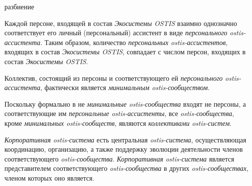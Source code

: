 \begin{SCn}
\begin{scnrelfromset}{разбиение}
\end{scnrelfromset}
\end{SCn}

Каждой персоне, входящей в состав \textit{Экосистемы OSTIS} взаимно однозначно соответствует его личный (персональный) ассистент в виде \textit{персонального ostis-ассистента}.
Таким образом, количество \textit{персональных ostis-ассистентов}, входящих в состав \textit{Экосистемы OSTIS}, совпадает с числом персон, входящих в состав \textit{Экосистемы OSTIS}.


Коллектив, состоящий из персоны и соответствующего ей \textit{персонального ostis-ассистента}, фактически является \textit{минимальным ostis-сообществом}.


Поскольку формально в не \textit{минимальные ostis-сообщества} входят не персоны, а соответствующие им \textit{персональные ostis-ассистенты}, все \textit{ostis-сообщества}, кроме \textit{минимальных ostis-сообществ}, являются \textit{коллективами ostis-систем}.

\textit{Корпоративная ostis-система} есть центральная \textit{ostis-система}, осуществляющая координацию, организацию, а также поддержку эволюции деятельности членов соответствующего \textit{ostis-сообщества}. 
\textit{Корпоративная ostis-система} является представителем соответствующего \textit{ostis-сообщества} в других \textit{ostis-сообществах}, членом которых оно является.

